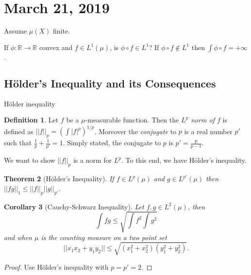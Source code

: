 \documentclass{article}
\newtheorem{theorem}{Theorem}[section]
\newtheorem{corollary}[theorem]{Corollary}
\theoremstyle{definition}
\newtheorem{definition}[theorem]{Definition}
\begin{document}

\section{March 21, 2019}

Assume $\mu(X)$ finite.


If $\phi:\mathbb{R}\rightarrow\mathbb{R}$ convex and $f\in L^1(\mu)$, is $\phi\circ f\in L^1$? If $\phi\circ f\notin L^1$ then $\int \phi\circ f=+\infty$.


\subsection{H\"older's Inequality and its Consequences}

H\"older inequality

\begin{definition}
    Let $f$ be a $\mu$-measurable function. Then the \textit{$L^p$ norm of $f$} is defined as
    $||f||_p=\left(\int |f|^p\right)^{1/p}$. Moreover the \textit{conjugate} to $p$ is a real number
    $p'$ such that $\frac{1}{p}+\frac{1}{p'}=1$. Simply stated, the conjugate to $p$ is $p'=\frac{p}{p-1}$.
\end{definition}

We want to show $||f||_p$ is a norm for $L^p$. To this end, we have H\"older's inequality.

\begin{theorem}[H\"older's Inequality]
    If $f\in L^p(\mu)$ and $g\in L^{p'}(\mu)$ then $||fg||_1\leq ||f||_p||g||_{p'}$.
\end{theorem}

\begin{corollary}[Cauchy-Schwarz Inequality]
    Let $f,g\in L^2(\mu)$, then
    \[
        \int fg \leq \sqrt{\int f^2\int g^2}
    \]
    and when $\mu$ is the counting measure on a two point set
    \[
        ||x_1x_2+y_1y_2||\leq \sqrt{(x_1^2+x_2^2)(y_1^2+y_2^2)}.
    \]
\end{corollary}
\begin{proof}
    Use H\"older's inequality with $p=p'=2$.
\end{proof}
\end{document}
